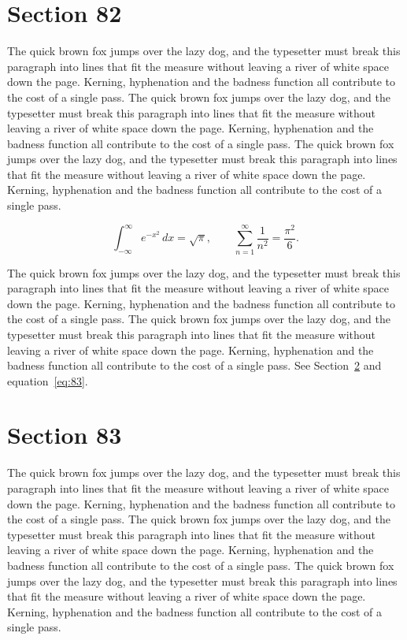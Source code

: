 \documentclass{article}
\begin{document}
\section{Section 82}
\label{sec:82}
The quick brown fox jumps over the lazy dog, and the typesetter must break this paragraph into lines that fit the measure without leaving a river of white space down the page. Kerning, hyphenation and the badness function all contribute to the cost of a single pass. The quick brown fox jumps over the lazy dog, and the typesetter must break this paragraph into lines that fit the measure without leaving a river of white space down the page. Kerning, hyphenation and the badness function all contribute to the cost of a single pass. The quick brown fox jumps over the lazy dog, and the typesetter must break this paragraph into lines that fit the measure without leaving a river of white space down the page. Kerning, hyphenation and the badness function all contribute to the cost of a single pass. 

\begin{equation}\label{eq:82}
\int_{-\infty}^{\infty} e^{-x^{2}}\,dx = \sqrt{\pi}, \qquad
\sum_{n=1}^{\infty} \frac{1}{n^{2}} = \frac{\pi^{2}}{6}.
\end{equation}

The quick brown fox jumps over the lazy dog, and the typesetter must break this paragraph into lines that fit the measure without leaving a river of white space down the page. Kerning, hyphenation and the badness function all contribute to the cost of a single pass. The quick brown fox jumps over the lazy dog, and the typesetter must break this paragraph into lines that fit the measure without leaving a river of white space down the page. Kerning, hyphenation and the badness function all contribute to the cost of a single pass. 
See Section~\ref{sec:83} and equation~\eqref{eq:83}.
\section{Section 83}
\label{sec:83}
The quick brown fox jumps over the lazy dog, and the typesetter must break this paragraph into lines that fit the measure without leaving a river of white space down the page. Kerning, hyphenation and the badness function all contribute to the cost of a single pass. The quick brown fox jumps over the lazy dog, and the typesetter must break this paragraph into lines that fit the measure without leaving a river of white space down the page. Kerning, hyphenation and the badness function all contribute to the cost of a single pass. The quick brown fox jumps over the lazy dog, and the typesetter must break this paragraph into lines that fit the measure without leaving a river of white space down the page. Kerning, hyphenation and the badness function all contribute to the cost of a single pass. 
\end{document}
